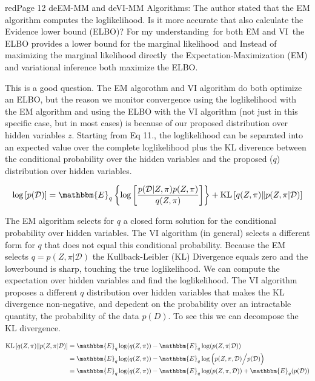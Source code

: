 \documentclass[
  fontsize=11pt,
  paper=a4,
  parskip=half,
  enlargefirstpage=on,    %
  fromalign=right,        %
  fromphone=on,           %
  fromrule=aftername,     %
  addrfield=on,           %
  backaddress=on,         %
  subject=beforeopening,  %
  locfield=narrow,        %
  foldmarks=on,           %
]{scrlttr2}
\def\l{\left}
\def\r{\right}
\newcommand{\f}{\frac}
\begin{document}
    \begin{commt}{red}{Page 12 deEM-MM and deVI-MM Algorithms: The author stated that the EM algorithm computes the loglikelihood. Is it more accurate that also calculate the Evidence lower bound (ELBO)? For my understanding\, for both EM and VI\, the ELBO provides a lower bound for the marginal likelihood\, and Instead of maximizing the marginal likelihood directly\, the Expectation-Maximization (EM) and variational inference both maximize the ELBO. }

      This is a good question. The EM algorothm and VI algorithm do both optimize an ELBO, but the reason we monitor convergence using the loglikelihood with the EM algorithm and using the ELBO with the VI algorithm (not just in this specific case, but in most cases) is because of our proposed distribution over hidden variables $z$.
      Starting from Eq 11., the loglikelihood can be separated into an expected value over the complete loglikelihood plus the KL diverence between the conditional probability over the hidden variables and the proposed ($q$) distribution over hidden variables.

      \begin{equation*}
        \log \l[ p(\mathcal{D}) \r] = \mathbbm{E}_{q} \l\{ \log \l[ \f{p(\mathcal{D} | Z,\pi) p(Z,\pi)}{q(Z,\pi)}  \r]  \r\} + \mathrm{KL} \l[q(Z,\pi) \| p(Z,\pi| \mathcal{D}) \r] 
      \end{equation*}
      
      The EM algorithm selects for $q$  a closed form solution for the conditional probability over hidden variables.
      The VI algorithm (in general) selects a different form for $q$ that does not equal this conditional probability.
      Because the EM selects $q = p(Z,\pi| \mathcal{D})$ the Kullback-Leibler (KL) Divergence equals zero and the lowerbound is sharp, touching the true loglikelihood.
      We can compute the expectation over hidden variables and find the loglikelihood.
      The VI algorithm proposes a different $q$ distribution over hidden variables that makes the KL divergence non-negative, and depedent on the probability over an intractable quantity, the probability of the data $p(D)$.
      To see this we can decompose the KL divergence.

      \begin{align*}
        \mathrm{KL} \l[q(Z,\pi) \| p(Z,\pi| \mathcal{D}) \r]  &= \mathbbm{E}_{q} \log(q(Z,\pi)) - \mathbbm{E}_{q}\log(  p(Z,\pi| \mathcal{D}) )\\
                                                              &= \mathbbm{E}_{q}\log(q(Z,\pi)) - \mathbbm{E}_{q}\log\l(  p(Z,\pi, \mathcal{D})  \Big /  p(\mathcal{D}) \r)\\
                                                              &= \mathbbm{E}_{q}\log(q(Z,\pi)) - \mathbbm{E}_{q}\log(  p(Z,\pi, \mathcal{D}) )  + \mathbbm{E}_{q} ( p(\mathcal{D}) )
      \end{align*}


\end{commt}
\end{document}
